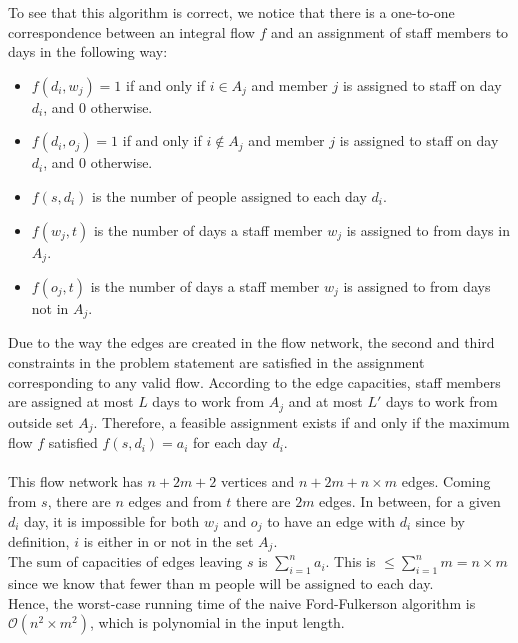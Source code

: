 \documentclass{article}
\begin{document}
\begin{enumerate}
\begin{enumerate}
\begin{itemize}
        \end{itemize}
        To see that this algorithm is correct, we notice that there is a one-to-one correspondence between an integral flow $f$ and an assignment of staff members to days in the following way:
        \begin{itemize}
            \item $f(d_i, w_j) = 1$ if and only if $i \in A_j$ and member $j$ is assigned to staff on day $d_i$, and 0 otherwise.
            \item $f(d_i, o_j) = 1$ if and only if $i \not \in A_j$ and member $j$ is assigned to staff on day $d_i$, and 0 otherwise.
            \item $f(s, d_i)$ is the number of people assigned to each day $d_i$.
            \item $f(w_j, t)$ is the number of days a staff member $w_j$ is assigned to from days in $A_j$.
            \item $f(o_j, t)$ is the number of days a staff member $w_j$ is assigned to from days not in $A_j$.
        \end{itemize}
        Due to the way the edges are created in the flow network, the second and third constraints in the problem statement are satisfied in the assignment corresponding to any valid flow. According to the edge capacities, staff members are assigned at most $L$ days to work from $A_j$ and at most $L'$ days to work from outside set $A_j$. Therefore, a feasible assignment exists if and only if the maximum flow $f$ satisfied $f(s, d_i) = a_i$ for each day $d_i$.\\
        \\
        This flow network has $n + 2m + 2$ vertices and $n + 2m + n \times m$ edges. Coming from $s$, there are $n$ edges and from $t$ there are $2m$ edges. In between, for a given $d_i$ day, it is impossible for both $w_j$ and $o_j$ to have an edge with $d_i$ since by definition, $i$ is either in or not in the set $A_j$.\\
        The sum of capacities of edges leaving $s$ is $\sum^n_{i=1} a_i$. This is $\leq \sum^n_{i=1} m = n \times m$ since we know that fewer than m people will be assigned to each day.\\
        Hence, the worst-case running time of the naive Ford-Fulkerson algorithm is $\mathcal{O} (n^2 \times m^2)$, which is polynomial in the input length.
    \end{enumerate}
\end{enumerate}
			
            
\end{document}
